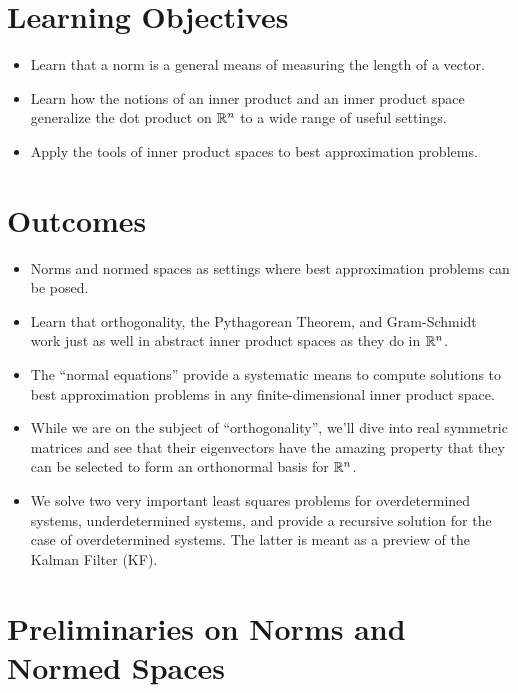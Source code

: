 \section*{Learning Objectives}

\begin{itemize}
\item Learn that a norm is a general means of measuring the length of a vector. 
\item Learn how the notions of an inner product and an inner product space generalize the dot product on $\mathbb R^n$ to a wide range of useful settings.
\item Apply the tools of inner product spaces to best approximation problems. 
\end{itemize}

\section*{Outcomes} 
\begin{itemize}
\item Norms and normed spaces as settings where best approximation problems can be posed.
\item Learn that orthogonality, the Pythagorean Theorem, and Gram-Schmidt work just as well in abstract inner product spaces as they do in $\mathbb R^n$.
\item The ``normal equations'' provide a systematic means to compute solutions to best approximation problems in any finite-dimensional inner product space.
\item While we are on the subject of ``orthogonality'', we'll dive into real symmetric matrices and see that their eigenvectors have the amazing property that they can be selected to form an orthonormal basis for $\mathbb R^n$.
\item We solve two very important least squares problems for overdetermined systems, underdetermined systems, and provide a recursive solution for the case of overdetermined systems. The latter is meant as a preview of the Kalman Filter (KF).
\end{itemize}

\newpage

\section{Preliminaries on Norms and Normed Spaces}
\label{sec:NormsDistance}


